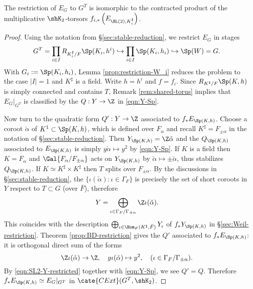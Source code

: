 \documentclass[a4paper,10pt]{article}
\begin{document}
\begin{theorem}\label{prop:G-T-reduction-K_2}
	The restriction of $E_G$ to $G^T$ is isomorphic to the contracted product of the multiplicative $\shK_2$-torsors $f_{i,*} \left( E_{\SL(2), K_i^\sharp} \right)$.
\end{theorem}
\begin{proof}
	Using the notation from \S\ref{sec:stable-reduction}, we restrict $E_G$ in stages
	\[ G^T = \prod_{i \in I} R_{K^\sharp_i/F} \Sp(K_i, h^i) \hookrightarrow \prod_{i \in I} \Sp(K_i, h_i) \hookrightarrow \Sp(W) = G. \]
	With $G_i := \Sp(K_i, h_i)$, Lemma \ref{prop:restriction-W_i} reduces the problem to the case $|I|=1$ and $K^\sharp$ is a field. Write $h = h^i$ and $f = f_i$. Since $R_{K^\sharp/F} \Sp(K, h)$ is simply connected and contains $T$, Remark \ref{rem:shared-torus} implies that $E_G|_{G^T}$ is classified by the $Q: Y \to \Z$ in \eqref{eqn:Y-Sp}.

	Now turn to the quadratic form $Q': Y \to \Z$ associated to $f_* E_{\Sp(K, h)}$. Choose a coroot $\check{\alpha}$ of $K^1 \subset \Sp(K,h)$, which is defined over $F_\alpha$ and recall $K^\sharp = F_{\pm\alpha}$ in the notation of \S\ref{sec:stable-reduction}. Then $Y_{\Sp(K,h)} = \Z\check{\alpha}$ and the $Q_{\Sp(K,h)}$ associated to $E_{\Sp(K,h)}$ is simply $y\check{\alpha} \mapsto y^2$ by \eqref{eqn:Y-Sp}. If $K$ is a field then $K=F_\alpha$ and $\Gal{F_\alpha/F_{\pm\alpha}}$ acts on $Y_{\Sp(K,h)}$ by $\check{\alpha} \mapsto \pm\check{\alpha}$, thus stabilizes $Q_{\Sp(K,h)}$. If $K \simeq K^\sharp \times K^\sharp$ then $T$ splits over $F_{\pm\alpha}$. By the discussions in \S\ref{sec:stable-reduction}, the $\{\iota(\check{\alpha}) : \iota \in \Gamma_F \}$ is precisely the set of short coroots in $Y$ respect to $T \subset G$ (over $\bar{F}$), therefore
	\begin{equation}\label{eqn:SL2-Y-restricted}
		Y = \bigoplus_{\iota \in \Gamma_F/\Gamma_{\pm\alpha}} \Z\iota(\check{\alpha}).
	\end{equation}
	This coincides with the description $\bigoplus_{\iota \in \Hom_F(K^\sharp, \bar{F})} Y_\iota$ of $f_* Y_{\Sp(K,h)}$ in \S\ref{sec:Weil-restriction}. Theorem \ref{prop:BD-restriction} gives the $Q'$ associated to $f_* E_{\Sp(K, h)}$: it is orthogonal direct sum of the forms
	\[ \Z\iota(\check{\alpha}) \to \Z, \quad y\iota(\check{\alpha}) \mapsto y^2, \quad (\iota \in \Gamma_F/\Gamma_{\pm\alpha}). \]
	By \eqref{eqn:SL2-Y-restricted} together with \eqref{eqn:Y-Sp}, we see $Q' = Q$. Therefore $f_* E_{\Sp(K,h)} \simeq E_G|_{G^T}$ in $\cate{CExt}(G^T, \shK_2)$.
\end{proof}
\end{document}
